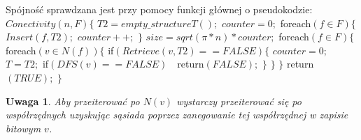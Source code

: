 \documentclass{pracamgr}
\newtheorem{remark}[theorem]{Uwaga}
\begin{document}
     Spójność sprawdzana jest przy pomocy funkcji głównej o pseudokodzie:\newline\newline
     \hspace*{0pt}$Conectivity(n,F)\{$\newline
     \hspace*{16pt}	$T2=empty\_structureT();$\newline
     \hspace*{16pt}	$counter=0;$\newline
     \hspace*{16pt}	foreach$(f\in F)\{$\newline
     \hspace*{32pt}		$Insert(f,T2);$\newline
     \hspace*{32pt}		$counter++;$\newline
     \hspace*{16pt}	$\}$\newline
     \hspace*{16pt}	$size=sqrt(\pi*n)*counter;$\newline
     \hspace*{16pt}	foreach$(f\in F)\{$\newline
     \hspace*{32pt}		foreach$(v\in N(f))\{$\newline
     \hspace*{48pt}			if$(Retrieve(v,T2)==FALSE)\{$\newline
     \hspace*{64pt}				$counter=0;$\newline
     \hspace*{64pt}				$T=T2;$\newline
     \hspace*{64pt}				if$(DFS(v)==FALSE)\quad $return$(FALSE);$\newline
     \hspace*{48pt}			$\}$\newline
     \hspace*{32pt}		$\}$\newline
     \hspace*{16pt}	$\}$\newline
     \hspace*{16pt}	return$(TRUE);$\newline
     \hspace*{0pt}$\}$\newline
     \begin{remark}\label{przeszukiwanie N(v)}
      Aby przeiterować po $N(v)$ wystarczy przeiterować się po współrzędnych uzyskując sąsiada poprzez zanegowanie tej współrzędnej w zapisie bitowym $v$.
     \end{remark}
\end{document}
